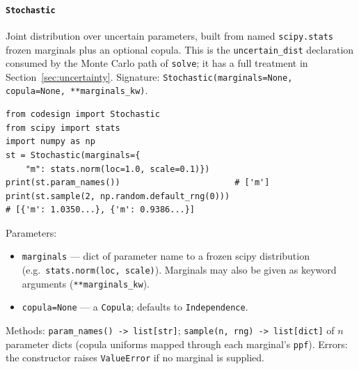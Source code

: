 \documentclass[11pt,a4paper]{article}
\begin{document}
\paragraph{\texttt{Stochastic}}\label{ref:uncertainty:stochastic}
Joint distribution over uncertain parameters, built from named
\texttt{scipy.stats} frozen marginals plus an optional copula. This is the
\texttt{uncertain\_dist} declaration consumed by the Monte Carlo path of
\texttt{solve}; it has a full treatment in Section~\ref{sec:uncertainty}.
Signature: \texttt{Stochastic(marginals=None, copula=None, **marginals\_kw)}.
\begin{lstlisting}
from codesign import Stochastic
from scipy import stats
import numpy as np
st = Stochastic(marginals={
    "m": stats.norm(loc=1.0, scale=0.1)})
print(st.param_names())                       # ['m']
print(st.sample(2, np.random.default_rng(0)))
# [{'m': 1.0350...}, {'m': 0.9386...}]
\end{lstlisting}
Parameters:
\begin{itemize}[nosep]
  \item \texttt{marginals} --- dict of parameter name to a frozen scipy
    distribution (e.g.\ \texttt{stats.norm(loc, scale)}). Marginals may also
    be given as keyword arguments (\texttt{**marginals\_kw}).
  \item \texttt{copula=None} --- a \texttt{Copula}; defaults to
    \texttt{Independence}.
\end{itemize}
Methods: \texttt{param\_names() -> list[str]}; \texttt{sample(n, rng) ->
list[dict]} of $n$ parameter dicts (copula uniforms mapped through each
marginal's \texttt{ppf}). Errors: the constructor raises \texttt{ValueError}
if no marginal is supplied.
\end{document}
